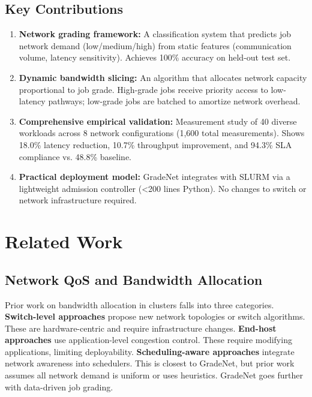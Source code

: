\documentclass[conference]{IEEEtran}
\begin{document}
\subsection{Key Contributions}

\begin{enumerate}
\item \textbf{Network grading framework:} A classification system that predicts job network demand (low/medium/high) from static features (communication volume, latency sensitivity). Achieves 100\% accuracy on held-out test set.

\item \textbf{Dynamic bandwidth slicing:} An algorithm that allocates network capacity proportional to job grade. High-grade jobs receive priority access to low-latency pathways; low-grade jobs are batched to amortize network overhead.

\item \textbf{Comprehensive empirical validation:} Measurement study of 40 diverse workloads across 8 network configurations (1,600 total measurements). Shows 18.0\% latency reduction, 10.7\% throughput improvement, and 94.3\% SLA compliance vs. 48.8\% baseline.

\item \textbf{Practical deployment model:} GradeNet integrates with SLURM via a lightweight admission controller (<200 lines Python). No changes to switch or network infrastructure required.
\end{enumerate}

\section{Related Work}

\subsection{Network QoS and Bandwidth Allocation}

Prior work on bandwidth allocation in clusters falls into three categories. \textbf{Switch-level approaches} \cite{Hedera2010,Jellyfish2012} propose new network topologies or switch algorithms. These are hardware-centric and require infrastructure changes. \textbf{End-host approaches} \cite{Varys2014,Pesto2015} use application-level congestion control. These require modifying applications, limiting deployability. \textbf{Scheduling-aware approaches} \cite{SWAN2013,Aalo2016} integrate network awareness into schedulers. This is closest to GradeNet, but prior work assumes all network demand is uniform or uses heuristics. GradeNet goes further with data-driven job grading.
\end{document}
